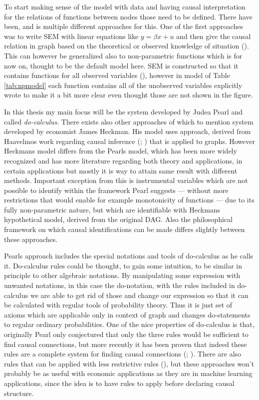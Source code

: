 \documentclass[main=english,12pt,a4paper,pdftex,econ,utf8]{aaltothesis}
\begin{document}
To start making sense of the model with data and having causal interpretation for the relations of functions between nodes those need to be defined. There have been, and is multiple different approaches for this. One of the first approaches was to write SEM with linear equations like $y=\beta x+u$ and then give the causal relation in graph based on the theoretical or observed knowledge of situation (\cite{Wright1921}). This can however be generalized also to non-parametric functions which is for now on, thought to be the default model here. SEM is constructed so that it contains functions for all observed variables (\cite{Pearl2008}), however in model of Table \ref{tab:npmodel} each function contains all of the unobserved variables explicitly wrote to make it a bit more clear even thought those are not shown in the figure.



In this thesis my main focus will be the system developed by Judea Pearl and called \textit{do-calculus}. There exists also other approaches of which to mention system developed by economist James Heckman. His model uses approach, derived from Haavelmos work regarding causal inference (\cite{Haavelmo1943}; \cite{Haavelmo1944}) that is applied to graphs. However Heckmans model differs from the Pearls model, which has been more widely recognized and has more literature regarding both theory and applications, in certain applications but mostly it is way to attain same result with different methods. Important exception from this is instrumental variables which are not possible to identify within the framework Pearl suggests --- without more restrictions that would enable for example monotonicity of functions --- due to its fully non-parametric nature, but which are identifiable with Heckmans hypothetical model, derived from the original DAG. Also the philosophical framework on which causal identifications can be made differs slightly between these approaches.

Pearls approach includes the special notations and tools of do-calculus as he calls it. Do-calculus rules could be thought, to gain some intuition, to be similar in principle to other algebraic notations. By manipulating some expression with unwanted notations, in this case the do-notation, with the rules included in do-calculus we are able to get rid of those and change our expression so that it can be calculated with regular tools of probability theory. Thus it is just set of axioms which are applicable only in context of graph and changes do-statements to regular ordinary probabilities. One of the nice properties of do-calculus is that, originally Pearl only conjectured that only the three rules would be sufficient to find causal connections, but more recently it has been proven that indeed these rules are a complete system for finding causal connections (\cite{Shpitser2006}; \cite{Huang2006}). There are also rules that can be applied with less restrictive rules (\cite{Hyttinen2015}), but these approaches won't probably be as useful with economic applications as they are in machine learning applications, since the idea is to have rules to apply before declaring causal structure.
\end{document}
